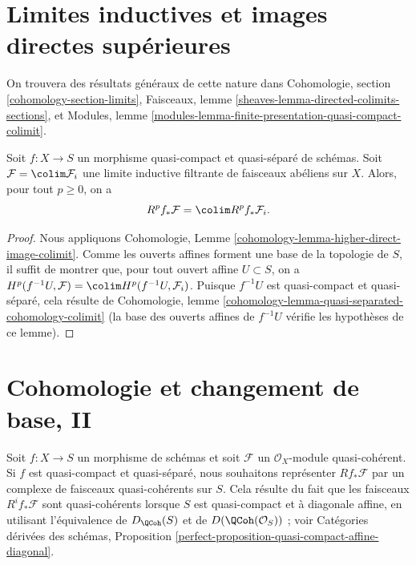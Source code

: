 \section{Limites inductives et images directes supérieures}
\label{section-colimits}

\noindent
On trouvera des résultats généraux de cette nature dans
Cohomologie, section \ref{cohomology-section-limits},
Faisceaux, lemme \ref{sheaves-lemma-directed-colimits-sections}, et
Modules, lemme \ref{modules-lemma-finite-presentation-quasi-compact-colimit}.

\begin{lemma}
\label{lemma-colimit-cohomology}
Soit $f : X \to S$ un morphisme quasi-compact et quasi-séparé de schémas.
Soit $\mathcal{F} = \colim \mathcal{F}_i$ une limite inductive filtrante
de faisceaux abéliens sur $X$. Alors, pour tout $p \geq 0$, on a
$$
R^pf_*\mathcal{F} = \colim R^pf_*\mathcal{F}_i.
$$
\end{lemma}

\begin{proof}
Nous appliquons Cohomologie, Lemme
\ref{cohomology-lemma-higher-direct-image-colimit}.
Comme les ouverts affines forment une base de la topologie de $S$,
il suffit de montrer que, pour tout ouvert affine $U \subset S$, on a
$H^p(f^{-1}U, \mathcal{F}) = \colim H^p(f^{-1}U, \mathcal{F}_i)$.
Puisque $f^{-1}U$ est quasi-compact et quasi-séparé, cela résulte
de
Cohomologie, lemme \ref{cohomology-lemma-quasi-separated-cohomology-colimit} (la
base des ouverts affines de $f^{-1}U$
vérifie les hypothèses de ce lemme).
\end{proof}










\section{Cohomologie et changement de base, II}
\label{section-cohomology-and-base-change-derived}

\noindent
Soit $f : X \to S$ un morphisme de schémas et soit $\mathcal{F}$
un $\mathcal{O}_X$-module quasi-cohérent. Si $f$ est quasi-compact
et quasi-séparé, nous souhaitons représenter $Rf_*\mathcal{F}$
par un complexe de faisceaux quasi-cohérents sur $S$. Cela résulte
du fait que les faisceaux $R^if_*\mathcal{F}$ sont quasi-cohérents
lorsque $S$ est quasi-compact et à diagonale affine, en utilisant
l'équivalence de $D_\QCoh(S)$ et de
$D(\QCoh(\mathcal{O}_S))$ ; voir
Catégories dérivées des schémas, Proposition
\ref{perfect-proposition-quasi-compact-affine-diagonal}.

